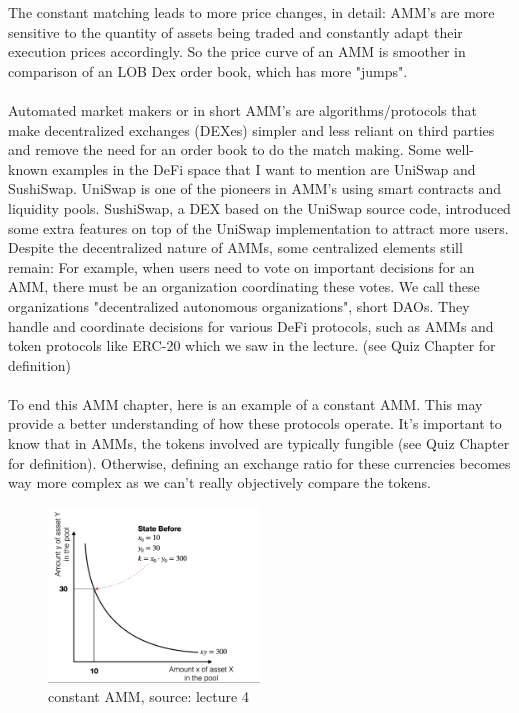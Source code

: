 \documentclass{article}
\begin{document}
The constant matching leads to more price changes, in detail:  AMM's are more sensitive to the quantity of assets being traded and constantly adapt their execution prices accordingly. So the price curve of an AMM is smoother in comparison of an LOB Dex order book, which has more "jumps". \\\\Automated market makers or in short AMM's are algorithms/protocols that make decentralized exchanges (DEXes) simpler and less reliant on third parties and remove the need for an order book to do the match making. Some well-known examples in the DeFi space that I want to mention are UniSwap and SushiSwap. UniSwap is one of the pioneers in AMM's using smart contracts and liquidity pools. SushiSwap, a DEX based on the UniSwap source code, introduced some extra features on top of the UniSwap implementation to attract more users. Despite the decentralized nature of AMMs, some centralized elements still remain: For example, when users need to vote on important decisions for an AMM, there must be an organization coordinating these votes. We call these organizations "decentralized autonomous organizations", short DAOs.  They handle and coordinate decisions for various DeFi protocols, such as AMMs and token protocols like ERC-20 which we saw in the lecture. (see Quiz Chapter for definition) \\
\\
To end this AMM chapter, here is an example of a constant AMM. This may provide a better understanding of how these protocols operate. It's important to know that in AMMs, the tokens involved are typically fungible (see Quiz Chapter for definition). Otherwise, defining an exchange ratio for these currencies becomes way more complex as we can't really objectively compare the tokens.
\begin{figure}[h]
    \centering
    \includegraphics[width=0.5\textwidth]{Bildschirmfoto 2024-04-02 um 15.16.43.png} %
    \caption{constant AMM, \scriptsize{source: lecture 4}}
    \label{fig:DoS-attack}
\end{figure}
\end{document}
